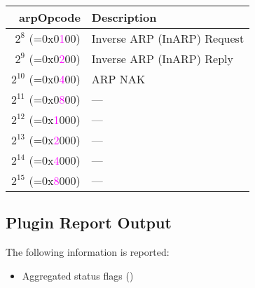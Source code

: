 \documentclass[documentation]{subfiles}
\begin{document}
\begin{minipage}{.46\textwidth}
    \begin{longtable}{rl}
        \toprule
        {\bf arpOpcode} & {\bf Description}\\
        \midrule\endhead%
        $2^{8}$  (=0x0\textcolor{magenta}{1}00) & Inverse ARP (InARP) Request\\
        $2^{9}$  (=0x0\textcolor{magenta}{2}00) & Inverse ARP (InARP) Reply\\
        $2^{10}$ (=0x0\textcolor{magenta}{4}00) & ARP NAK\\
        $2^{11}$ (=0x0\textcolor{magenta}{8}00) & ---\\
        $2^{12}$ (=0x\textcolor{magenta}{1}000) & ---\\
        $2^{13}$ (=0x\textcolor{magenta}{2}000) & ---\\
        $2^{14}$ (=0x\textcolor{magenta}{4}000) & ---\\
        $2^{15}$ (=0x\textcolor{magenta}{8}000) & ---\\
        \bottomrule
    \end{longtable}
\end{minipage}

\clearpage

\subsection{Plugin Report Output}
The following information is reported:
\begin{itemize}
    \item Aggregated status flags ({\tt{}})
\end{itemize}
\end{document}
